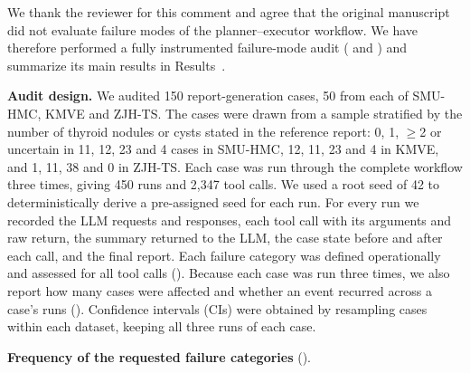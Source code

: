 We thank the reviewer for this comment and agree that the original manuscript did not evaluate failure modes of the planner--executor workflow. We have therefore performed a fully instrumented failure-mode audit ( and ) and summarize its main results in Results~\SecResReport{}.\par

\textbf{Audit design.} We audited 150 report-generation cases, 50 from each of SMU-HMC, KMVE and ZJH-TS. The cases were drawn from a sample stratified by the number of thyroid nodules or cysts stated in the reference report: 0, 1, $\geq$2 or uncertain in 11, 12, 23 and 4 cases in SMU-HMC, 12, 11, 23 and 4 in KMVE, and 1, 11, 38 and 0 in ZJH-TS. Each case was run through the complete workflow three times, giving 450 runs and 2,347 tool calls. We used a root seed of 42 to deterministically derive a pre-assigned seed for each run. For every run we recorded the LLM requests and responses, each tool call with its arguments and raw return, the summary returned to the LLM, the case state before and after each call, and the final report. Each failure category was defined operationally and assessed for all tool calls (). Because each case was run three times, we also report how many cases were affected and whether an event recurred across a case's runs (). Confidence intervals (CIs) were obtained by resampling cases within each dataset, keeping all three runs of each case.\par

\textbf{Frequency of the requested failure categories} ().\par

